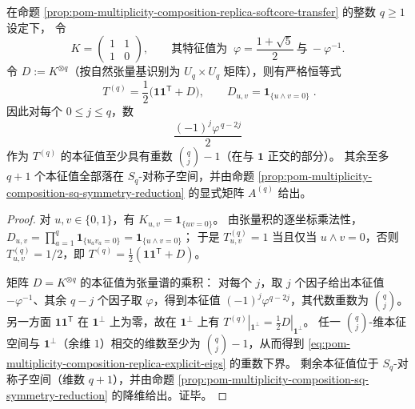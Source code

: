 \begin{proposition}\label{prop:pom-multiplicity-composition-replica-explicit-eigs}
在命题 \ref{prop:pom-multiplicity-composition-replica-softcore-transfer} 的整数 \(q\ge 1\) 设定下，
令
\[
K=\begin{pmatrix}1&1\\[2pt]1&0\end{pmatrix},
\qquad
\text{其特征值为 }\ \varphi=\frac{1+\sqrt5}{2}\ \text{与}\ -\varphi^{-1}.
\]
令 \(D:=K^{\otimes q}\)（按自然张量基识别为 \(U_q\times U_q\) 矩阵），则有严格恒等式
\[
\boxed{\;
T^{(q)}=\frac12\bigl(\mathbf{1}\mathbf{1}^{\mathsf T}+D\bigr),\qquad
D_{u,v}=\mathbf{1}_{\{u\wedge v=0\}}\; } .
\]
因此对每个 \(0\le j\le q\)，数
\begin{equation}\label{eq:pom-multiplicity-composition-replica-explicit-eigs}
\boxed{\;
\frac{(-1)^j\varphi^{\,q-2j}}{2}\;}
\end{equation}
作为 \(T^{(q)}\) 的本征值至少具有重数 \(\binom{q}{j}-1\)（在与 \(\mathbf{1}\) 正交的部分）。
其余至多 \(q+1\) 个本征值全部落在 \(S_q\)-对称子空间，并由命题 \ref{prop:pom-multiplicity-composition-sq-symmetry-reduction} 的显式矩阵 \(A^{(q)}\) 给出。
\end{proposition}
\begin{proof}
对 \(u,v\in\{0,1\}\)，有
\(
K_{u,v}=\mathbf{1}_{\{uv=0\}}
\)。
由张量积的逐坐标乘法性，
\(
D_{u,v}=\prod_{a=1}^q \mathbf{1}_{\{u_av_a=0\}}=\mathbf{1}_{\{u\wedge v=0\}}
\)；
于是
\(
T^{(q)}_{u,v}=1\) 当且仅当 \(u\wedge v=0\)，否则 \(T^{(q)}_{u,v}=1/2\)，即 \(T^{(q)}=\frac12(\mathbf{1}\mathbf{1}^{\mathsf T}+D)\)。
\par
矩阵 \(D=K^{\otimes q}\) 的本征值为张量谱的乘积：
对每个 \(j\)，取 \(j\) 个因子给出本征值 \(-\varphi^{-1}\)、其余 \(q-j\) 个因子取 \(\varphi\)，得到本征值 \((-1)^j\varphi^{q-2j}\)，其代数重数为 \(\binom{q}{j}\)。
另一方面 \(\mathbf{1}\mathbf{1}^{\mathsf T}\) 在 \(\mathbf{1}^\perp\) 上为零，故在 \(\mathbf{1}^\perp\) 上有 \(T^{(q)}|_{\mathbf{1}^\perp}=\frac12 D|_{\mathbf{1}^\perp}\)。
任一 \(\binom{q}{j}\)-维本征空间与 \(\mathbf{1}^\perp\)（余维 \(1\)）相交的维数至少为 \(\binom{q}{j}-1\)，从而得到 \eqref{eq:pom-multiplicity-composition-replica-explicit-eigs} 的重数下界。
剩余本征值位于 \(S_q\)-对称子空间（维数 \(q+1\)），并由命题 \ref{prop:pom-multiplicity-composition-sq-symmetry-reduction} 的降维给出。证毕。
\end{proof}

